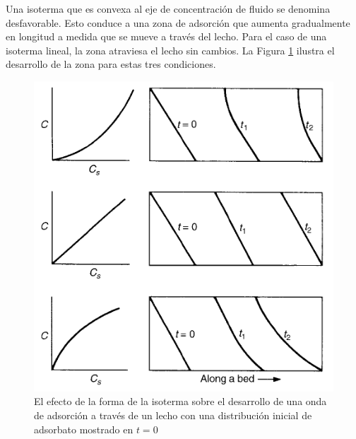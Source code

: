 \documentclass[11pt]{book}
\begin{document}
Una isoterma que es convexa al eje de concentración de fluido se denomina desfavorable. Esto conduce a una zona de adsorción que aumenta gradualmente en longitud a medida que se mueve a través del lecho. Para el caso de una isoterma lineal, la zona atraviesa el lecho sin cambios. La Figura \ref{fig:Isoterma_Adsorcion_Curva} ilustra el desarrollo de la zona para estas tres condiciones.

\begin{figure}
    \centering
    \includegraphics{img/adsorcion/LechoEmpacado_4.PNG}
    \caption{El efecto de la forma de la isoterma sobre el desarrollo de una onda de adsorción a través de un lecho con una distribución inicial de adsorbato mostrado en $t = 0$}
    \label{fig:Isoterma_Adsorcion_Curva}
\end{figure}
\end{document}

